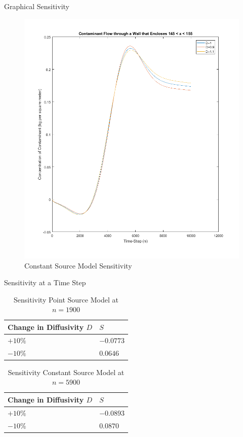 \documentclass[10pt]{beamer}
\begin{document}
\begin{frame}{Graphical Sensitivity}
\begin{figure}
\begin{minipage}[b]{0.4\textwidth}
   \includegraphics[trim=0mm 0mm 0mm 0mm,clip,width=1\linewidth]{senseconst.png}
\begin{center}
\caption{Constant Source Model Sensitivity}
\end{center}
\end{minipage}
\end{figure}
\hyperlink{Questions}{}
\end{frame}

\begin{frame}{Sensitivity at a Time Step}\label{Sensitivity at time step}

\begin{table}
\caption{Sensitivity Point Source Model at $n=1900$}
\begin{tabular}{|l|l|}
\hline
Change in Diffusivity $D$          & $S$ \\ \hline
$+10\%$    & $-0.0773$              \\ \hline
$-10\%$   & $0.0646$              \\ \hline
\end{tabular}
\end{table}

\begin{table}
\centering
\caption{Sensitivity Constant Source Model at $n=5900$}
\begin{tabular}{|l|l|}
\hline
Change in Diffusivity $D$           & $S$ \\ \hline
$+10\%$    & $-0.0893$              \\ \hline
$-10\%$   & $0.0870$              \\ \hline
\end{tabular}
\end{table}
\hyperlink{Questions}{}
\end{frame}
\end{document}

